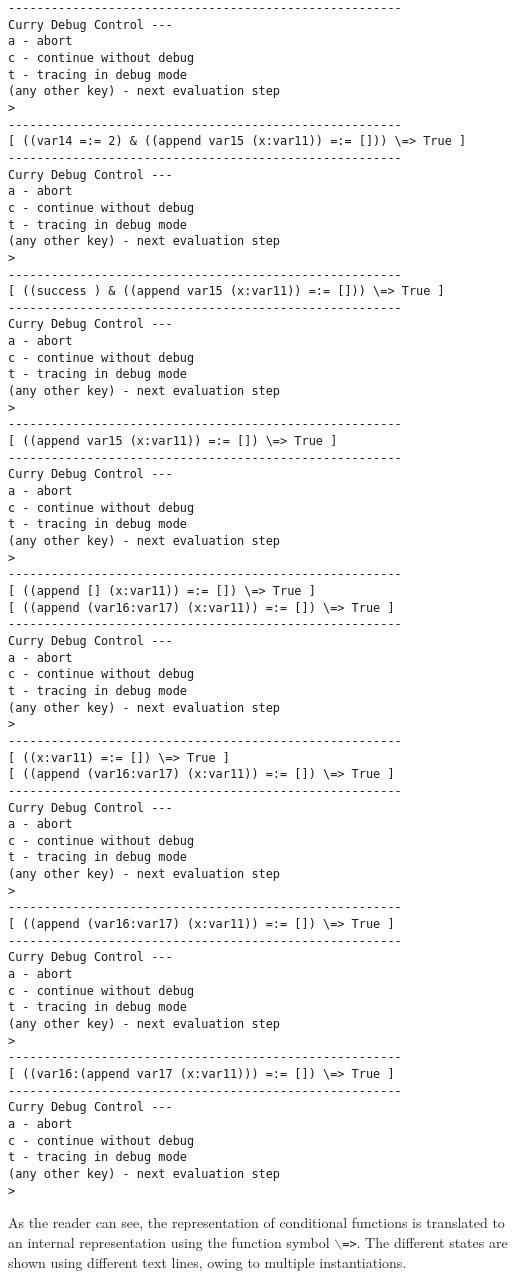 \documentclass[titlepage,fleqn]{article}
\newcommand{\pr}[1]{\mbox{\tt #1}}   %
\begin{document}
{\begin{verbatim}
-------------------------------------------------------
Curry Debug Control ---
a - abort
c - continue without debug
t - tracing in debug mode
(any other key) - next evaluation step
> 
-------------------------------------------------------
[ ((var14 =:= 2) & ((append var15 (x:var11)) =:= [])) \=> True ]
-------------------------------------------------------
Curry Debug Control ---
a - abort
c - continue without debug
t - tracing in debug mode
(any other key) - next evaluation step
> 
-------------------------------------------------------
[ ((success ) & ((append var15 (x:var11)) =:= [])) \=> True ]
-------------------------------------------------------
Curry Debug Control ---
a - abort
c - continue without debug
t - tracing in debug mode
(any other key) - next evaluation step
> 
-------------------------------------------------------
[ ((append var15 (x:var11)) =:= []) \=> True ]
-------------------------------------------------------
Curry Debug Control ---
a - abort
c - continue without debug
t - tracing in debug mode
(any other key) - next evaluation step
> 
-------------------------------------------------------
[ ((append [] (x:var11)) =:= []) \=> True ]
[ ((append (var16:var17) (x:var11)) =:= []) \=> True ]
-------------------------------------------------------
Curry Debug Control ---
a - abort
c - continue without debug
t - tracing in debug mode
(any other key) - next evaluation step
> 
-------------------------------------------------------
[ ((x:var11) =:= []) \=> True ]
[ ((append (var16:var17) (x:var11)) =:= []) \=> True ]
-------------------------------------------------------
Curry Debug Control ---
a - abort
c - continue without debug
t - tracing in debug mode
(any other key) - next evaluation step
> 
-------------------------------------------------------
[ ((append (var16:var17) (x:var11)) =:= []) \=> True ]
-------------------------------------------------------
Curry Debug Control ---
a - abort
c - continue without debug
t - tracing in debug mode
(any other key) - next evaluation step
> 
-------------------------------------------------------
[ ((var16:(append var17 (x:var11))) =:= []) \=> True ]
-------------------------------------------------------
Curry Debug Control ---
a - abort
c - continue without debug
t - tracing in debug mode
(any other key) - next evaluation step
> 
\end{verbatim}
}

As the reader can see, the representation of conditional functions 
is translated to an internal
representation using the function symbol \pr{$\backslash$=>}.
The different states are shown using different text lines,
owing to multiple instantiations.
\end{document}
